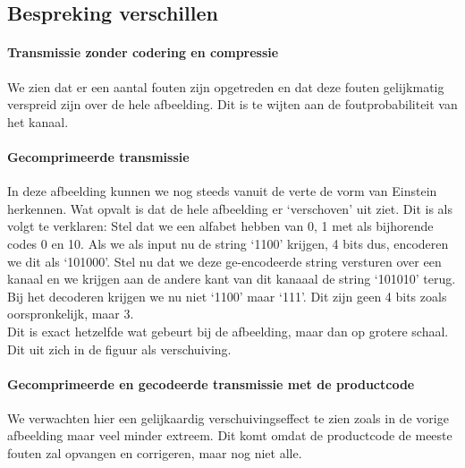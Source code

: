 \documentclass[11pt,a4paper]{article}
\begin{document}
\subsection{Bespreking verschillen}

\paragraph*{Transmissie zonder codering en compressie} We zien dat er een aantal fouten zijn opgetreden en dat deze fouten gelijkmatig verspreid zijn over de hele afbeelding. Dit is te wijten aan de foutprobabiliteit van het kanaal. 

\paragraph*{Gecomprimeerde transmissie} In deze afbeelding kunnen we nog steeds vanuit de verte de vorm van Einstein herkennen. Wat opvalt is dat de hele afbeelding er `verschoven' uit ziet. Dit is als volgt te verklaren: Stel dat we een alfabet hebben van 0, 1 met als bijhorende codes 0 en 10. Als we als input nu de string `1100' krijgen, 4 bits dus, encoderen we dit als `101000'. Stel nu dat we deze ge-encodeerde string versturen over een kanaal en we krijgen aan de andere kant van dit kanaaal de string `101010' terug. Bij het decoderen krijgen we nu niet `1100' maar `111'. Dit zijn geen 4 bits zoals oorspronkelijk, maar 3.\\
Dit is exact hetzelfde wat gebeurt bij de afbeelding, maar dan op grotere schaal. Dit uit zich in de figuur als verschuiving.

\paragraph*{Gecomprimeerde en gecodeerde transmissie met de productcode} We verwachten hier een gelijkaardig verschuivingseffect te zien zoals in de vorige afbeelding maar veel minder extreem. Dit komt omdat de productcode de meeste fouten zal opvangen en corrigeren, maar nog niet alle.
\end{document}
